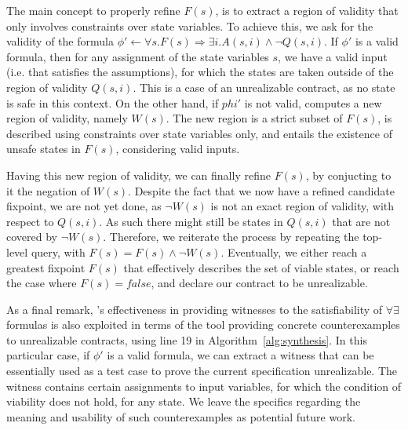 The main concept to properly refine $F(s)$, is to extract a region of validity
that only involves constraints over state variables. To achieve this, we ask for
the validity of the formula $\phi' \gets \forall s. F(s) \Rightarrow \exists
i. A(s,i) \land \lnot Q(s,i)$. If $\phi'$ is a valid formula, then for any
assignment of the state variables $s$, we have a valid input (i.e. that
satisfies the assumptions), for which the states are taken outside of the region
of validity $Q(s,i)$. This is a case of an unrealizable contract, as no state is
safe in this context. On the other hand, if $phi'$ is not valid, \aeval computes
a new region of validity, namely $W(s)$. The new region is a strict subset of
$F(s)$, is described using constraints over state variables only, and entails
the existence of unsafe states in $F(s)$, considering valid inputs.

Having this new region of validity, we can finally refine $F(s)$, by conjucting
to it the negation of $W(s)$. Despite the fact that we now have a refined
candidate fixpoint, we are not yet done, as $\lnot W(s)$ is not an exact region
of validity, with respect to $Q(s,i)$. As such there might still be states in
$Q(s,i)$ that are not covered by $\lnot W(s)$. Therefore, we reiterate the
process by repeating the top-level \aeval query, with $F(s) = F(s) \land \lnot
W(s)$. Eventually, we either reach a greatest fixpoint $F(s)$ that effectively
describes the set of viable states, or reach the case where $F(s) = false$, and
declare our contract to be unrealizable.

As a final remark, \aeval's effectiveness in providing witnesses to the
satisfiability of $\forall\exists$ formulas is also exploited in terms of the
tool providing concrete counterexamples to unrealizable contracts, using line 19
in Algorithm~\ref{alg:synthesis}. In this particular case, if $\phi'$ is a valid
formula, we can extract a witness that can be essentially used as a test case to
prove the current specification unrealizable. The witness contains certain
assignments to input variables, for which the condition of viability does not
hold, for any state. We leave the specifics regarding the meaning and usability
of such counterexamples as potential future work.



